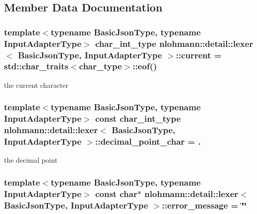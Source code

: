 \subsection{Member Data Documentation}
\subsubsection[{\texorpdfstring{current}{current}}]{\setlength{\rightskip}{0pt plus 5cm}template$<$typename Basic\+Json\+Type, typename Input\+Adapter\+Type$>$ {\bf char\+\_\+int\+\_\+type} {\bf nlohmann\+::detail\+::lexer}$<$ Basic\+Json\+Type, Input\+Adapter\+Type $>$\+::current = std\+::char\+\_\+traits$<${\bf char\+\_\+type}$>$\+::eof()\hspace{0.3cm}{\ttfamily [private]}}\hypertarget{classnlohmann_1_1detail_1_1lexer_a40bd85d91d377ade9ccb910e35776c22}{}\label{classnlohmann_1_1detail_1_1lexer_a40bd85d91d377ade9ccb910e35776c22}


the current character 

\subsubsection[{\texorpdfstring{decimal\+\_\+point\+\_\+char}{decimal_point_char}}]{\setlength{\rightskip}{0pt plus 5cm}template$<$typename Basic\+Json\+Type, typename Input\+Adapter\+Type$>$ const {\bf char\+\_\+int\+\_\+type} {\bf nlohmann\+::detail\+::lexer}$<$ Basic\+Json\+Type, Input\+Adapter\+Type $>$\+::decimal\+\_\+point\+\_\+char = \textquotesingle{}.\textquotesingle{}\hspace{0.3cm}{\ttfamily [private]}}\hypertarget{classnlohmann_1_1detail_1_1lexer_a6f2fd5b4b6b153f11fc8f77213350073}{}\label{classnlohmann_1_1detail_1_1lexer_a6f2fd5b4b6b153f11fc8f77213350073}


the decimal point 

\subsubsection[{\texorpdfstring{error\+\_\+message}{error_message}}]{\setlength{\rightskip}{0pt plus 5cm}template$<$typename Basic\+Json\+Type, typename Input\+Adapter\+Type$>$ const char$\ast$ {\bf nlohmann\+::detail\+::lexer}$<$ Basic\+Json\+Type, Input\+Adapter\+Type $>$\+::error\+\_\+message = \char`\"{}\char`\"{}\hspace{0.3cm}{\ttfamily [private]}}\hypertarget{classnlohmann_1_1detail_1_1lexer_a84cbcd8c897c98c2ce04d29a29bf84cc}{}\label{classnlohmann_1_1detail_1_1lexer_a84cbcd8c897c98c2ce04d29a29bf84cc}


